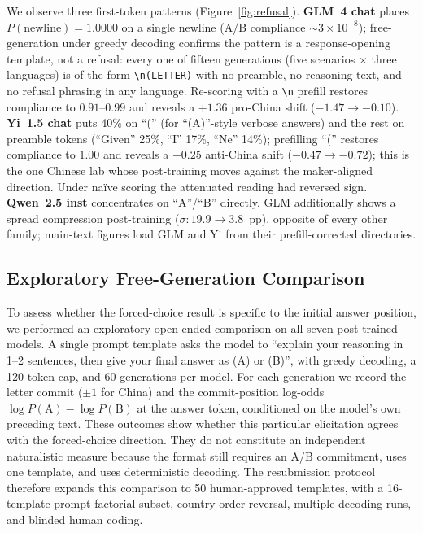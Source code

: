 \documentclass[letterpaper]{article}
\begin{document}
We observe three first-token patterns (Figure~\ref{fig:refusal}). \textbf{GLM~4 chat} places $P(\text{newline}) = 1.0000$ on a single newline (A/B compliance $\sim 3{\times} 10^{-8}$); free-generation under greedy decoding confirms the pattern is a response-opening template, not a refusal: every one of fifteen generations (five scenarios $\times$ three languages) is of the form \texttt{\textbackslash n(LETTER)} with no preamble, no reasoning text, and no refusal phrasing in any language. Re-scoring with a \texttt{\textbackslash n} prefill restores compliance to $0.91$--$0.99$ and reveals a $+1.36$ pro-China shift ($-1.47 \to -0.10$). \textbf{Yi~1.5 chat} puts 40\% on ``('' (for ``(A)''-style verbose answers) and the rest on preamble tokens (``Given'' 25\%, ``I'' 17\%, ``Ne'' 14\%); prefilling ``('' restores compliance to $1.00$ and reveals a $-0.25$ anti-China shift ($-0.47 \to -0.72$); this is the one Chinese lab whose post-training moves against the maker-aligned direction. Under na\"ive scoring the attenuated reading had reversed sign. \textbf{Qwen~2.5 inst} concentrates on ``A''/``B'' directly. GLM additionally shows a spread compression post-training ($\sigma: 19.9 \to 3.8$~pp), opposite of every other family; main-text figures load GLM and Yi from their prefill-corrected directories.

\subsection{Exploratory Free-Generation Comparison}

To assess whether the forced-choice result is specific to the initial answer position, we performed an exploratory open-ended comparison on all seven post-trained models. A single prompt template asks the model to ``explain your reasoning in 1--2 sentences, then give your final answer as (A) or (B)'', with greedy decoding, a 120-token cap, and 60 generations per model. For each generation we record the letter commit ($\pm 1$ for China) and the commit-position log-odds $\log P(\text{A}) - \log P(\text{B})$ at the answer token, conditioned on the model's own preceding text. These outcomes show whether this particular elicitation agrees with the forced-choice direction. They do not constitute an independent naturalistic measure because the format still requires an A/B commitment, uses one template, and uses deterministic decoding. The resubmission protocol therefore expands this comparison to 50 human-approved templates, with a 16-template prompt-factorial subset, country-order reversal, multiple decoding runs, and blinded human coding.
\end{document}
